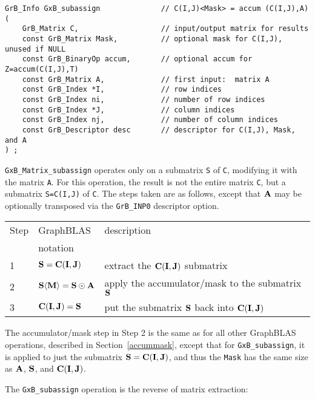 \documentclass[12pt]{article}
\begin{document}
{\begin{mdframed}[userdefinedwidth=6in]
{\footnotesize
\begin{verbatim}
GrB_Info GxB_subassign              // C(I,J)<Mask> = accum (C(I,J),A)
(
    GrB_Matrix C,                   // input/output matrix for results
    const GrB_Matrix Mask,          // optional mask for C(I,J), unused if NULL
    const GrB_BinaryOp accum,       // optional accum for Z=accum(C(I,J),T)
    const GrB_Matrix A,             // first input:  matrix A
    const GrB_Index *I,             // row indices
    const GrB_Index ni,             // number of row indices
    const GrB_Index *J,             // column indices
    const GrB_Index nj,             // number of column indices
    const GrB_Descriptor desc       // descriptor for C(I,J), Mask, and A
) ;
\end{verbatim} } \end{mdframed}

\verb'GxB_Matrix_subassign' operates only on a submatrix \verb'S' of \verb'C',
modifying it with the matrix \verb'A'.   For this operation, the result is not
the entire matrix \verb'C', but a submatrix \verb'S=C(I,J)' of \verb'C'.  The
steps taken are as follows, except that ${\bf A}$ may be optionally transposed
via the \verb'GrB_INP0' descriptor option.

\vspace{0.1in}
\begin{tabular}{lll}
\hline
Step & GraphBLAS & description \\
     & notation  & \\
\hline
1 & ${\bf S} = {\bf C(I,J)}$                             & extract the ${\bf C(I,J)}$ submatrix \\
2 & ${\bf S \langle M \rangle} = {\bf S} \odot {\bf A}$  & apply the accumulator/mask to the submatrix ${\bf S}$\\
3 & ${\bf C(I,J)}= {\bf S}$                              & put the submatrix ${\bf S}$ back into ${\bf C(I,J)}$ \\
\hline
\end{tabular}
\vspace{0.1in}

The accumulator/mask step in Step 2 is the same as for all other GraphBLAS
operations, described in Section~\ref{accummask}, except that for
\verb'GxB_subassign', it is applied to just the submatrix ${\bf S} = {\bf
C(I,J)}$, and thus the \verb'Mask' has the same size as ${\bf A}$,
${\bf S}$, and ${\bf C(I,J)}$.

The \verb'GxB_subassign' operation is the reverse of matrix extraction:

}
\end{document}
